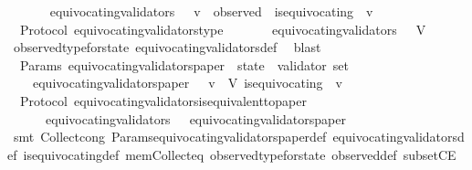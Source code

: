 \begin{isabellebody}
\ \ \isanewline
\ \ \ \ {\isachardoublequoteopen}equivocating{\isacharunderscore}validators\ {\isasymsigma}\ {\isacharequal}\ {\isacharbraceleft}v\ {\isasymin}\ observed\ {\isasymsigma}{\isachardot}\ is{\isacharunderscore}equivocating\ {\isasymsigma}\ v{\isacharbraceright}{\isachardoublequoteclose}\isanewline
\isanewline
{}\isamarkupfalse%
\ {\isacharparenleft}\ Protocol{\isacharparenright}\ equivocating{\isacharunderscore}validators{\isacharunderscore}type\ {\isacharcolon}\isanewline
\ \ {\isachardoublequoteopen}{\isasymforall}\ {\isasymsigma}\ {\isasymin}\ {\isasymSigma}{\isachardot}\ equivocating{\isacharunderscore}validators\ {\isasymsigma}\ {\isasymsubseteq}\ V{\isachardoublequoteclose}\isanewline
%
\isadelimproof
\ \ %
\endisadelimproof
%
\isatagproof
{}\isamarkupfalse%
\ observed{\isacharunderscore}type{\isacharunderscore}for{\isacharunderscore}state\ equivocating{\isacharunderscore}validators{\isacharunderscore}def\ \isamarkupfalse%
\ blast%
\endisatagproof
{\isafoldproof}%
%
\isadelimproof
\isanewline
%
\endisadelimproof
\isanewline
{}\isamarkupfalse%
\ {\isacharparenleft}\ Params{\isacharparenright}\ equivocating{\isacharunderscore}validators{\isacharunderscore}paper\ {\isacharcolon}{\isacharcolon}\ {\isachardoublequoteopen}state\ {\isasymRightarrow}\ validator\ set{\isachardoublequoteclose}\isanewline
\ \ \isanewline
\ \ \ \ {\isachardoublequoteopen}equivocating{\isacharunderscore}validators{\isacharunderscore}paper\ {\isasymsigma}\ {\isacharequal}\ {\isacharbraceleft}v\ {\isasymin}\ V{\isachardot}\ is{\isacharunderscore}equivocating\ {\isasymsigma}\ v{\isacharbraceright}{\isachardoublequoteclose}\isanewline
\isanewline
{}\isamarkupfalse%
\ {\isacharparenleft}\ Protocol{\isacharparenright}\ equivocating{\isacharunderscore}validators{\isacharunderscore}is{\isacharunderscore}equivalent{\isacharunderscore}to{\isacharunderscore}paper\ {\isacharcolon}\isanewline
\ \ {\isachardoublequoteopen}{\isasymforall}\ {\isasymsigma}\ {\isasymin}\ {\isasymSigma}{\isachardot}\ equivocating{\isacharunderscore}validators\ {\isasymsigma}\ {\isacharequal}\ equivocating{\isacharunderscore}validators{\isacharunderscore}paper\ {\isasymsigma}{\isachardoublequoteclose}\isanewline
%
\isadelimproof
\ \ %
\endisadelimproof
%
\isatagproof
{}\isamarkupfalse%
\ {\isacharparenleft}smt\ Collect{\isacharunderscore}cong\ Params{\isachardot}equivocating{\isacharunderscore}validators{\isacharunderscore}paper{\isacharunderscore}def\ equivocating{\isacharunderscore}validators{\isacharunderscore}def\ is{\isacharunderscore}equivocating{\isacharunderscore}def\ mem{\isacharunderscore}Collect{\isacharunderscore}eq\ observed{\isacharunderscore}type{\isacharunderscore}for{\isacharunderscore}state\ observed{\isacharunderscore}def\ subsetCE{\isacharparenright}%

\end{isabellebody}

